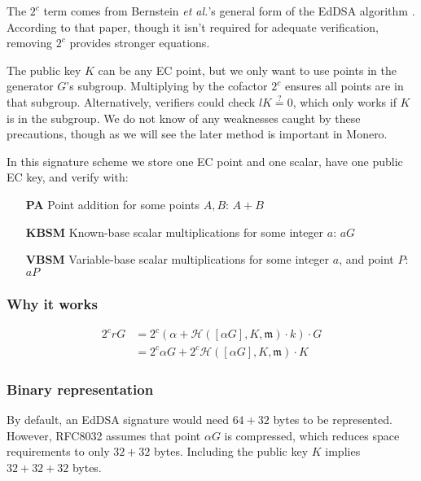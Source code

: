 The $2^c$ term comes from Bernstein {\em et al.}’s general form of the EdDSA algorithm \cite{Bernstein2007}. According to that paper, though it isn’t required for adequate verification, removing $2^c$ provides stronger equations.

The public key $K$ can be any EC point, but we only want to use points in the generator $G$'s subgroup. Multiplying by the cofactor $2^c$ ensures all points are in that subgroup. Alternatively, verifiers could check $l K \stackrel{?}{=} 0$, which only works if $K$ is in the subgroup. We do not know of any weaknesses caught by these precautions, though as we will see the later method is important in Monero.

In this signature scheme we store one EC point and one scalar, have one public EC key, and verify with:

\begin{itemize}
    \setlength\itemsep{\listspace}
    \item [\textbf{PA}] Point addition for some points $A, B$: $A + B$ \quad [1]
    \item [\textbf{KBSM}] Known-base scalar multiplications for some integer $a$: $a G$ \quad [1]
    \item [\textbf{VBSM}] Variable-base scalar multiplications for some integer $a$, and point $P$: $a P$ \quad [1]
\end{itemize}


\subsubsection{Why it works}

\begin{align*}
2^c r G &= 2^c (\alpha + \mathcal{H}([\alpha G], K,  \mathfrak{m}) \cdot k) \cdot G \\
		&= 2^c \alpha G + 2^c \mathcal{H}([\alpha G], K,  \mathfrak{m}) \cdot K 
\end{align*}


\subsubsection{Binary representation}

By default, an EdDSA signature would need \(64 + 32\) bytes to be represented. However, RFC8032 assumes that point \(\alpha G\) is compressed, which reduces space requirements to only \(32 + 32\) bytes. Including the public key $K$ implies \(32 + 32 + 32\) bytes.
